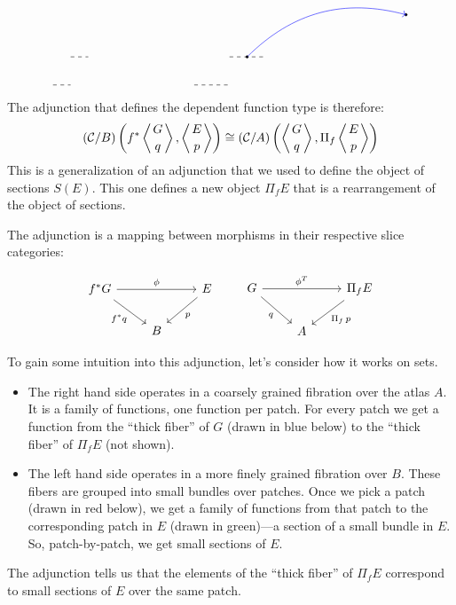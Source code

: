 \documentclass[DaoFP]{subfiles}
\begin{document}
\[\begin{tikzpicture}
\filldraw[black] (\xl + 3 * \dx, \yb + 5* \dy) circle (1 pt);
\filldraw[black] (\xr + 3 * \dx, \yb + 8* \dy) circle (1 pt);

\draw[blue] ((\xl + 3 * \dx, \yb + 5* \dy) edge[->, bend left] (\xr + 3 * \dx, \yb + 8* \dy);

\draw[dashed] (\xl, \yb + 3* \dy) -- (\xl + 2 * \dx, \yb + 3* \dy);
\draw[dashed] (\xl + 2 * \dx, \yb + 5* \dy) -- (\xl + 4* \dx, \yb + 5* \dy);

\draw[dashed] (\xmin, \yb + 3* \dy) -- (\xmin + \dx, \yb + 3* \dy);
\draw[dashed] (\xmin + \dx, \yb + 5* \dy) -- (\xmin + 2 * \dx, \yb + 5* \dy);

\end{tikzpicture}
\]

The adjunction that defines the dependent function type is therefore:
\[ (\mathcal{C}/B) \left( f^* \left \langle {G \atop q} \right \rangle, \left \langle {E \atop p} \right \rangle \right) \cong  (\mathcal{C}/A)\left( \left \langle {G \atop q} \right \rangle, \Pi_f \left \langle {E \atop p } \right \rangle \right) \]
This is a generalization of an adjunction that we used to define the object of sections $S(E)$. This one defines a new object $\Pi_f E$ that is a rearrangement of the object of sections. 

The adjunction is a mapping between morphisms in their respective slice categories:

\[
 \begin{tikzcd}
 f^* G
 \arrow[rr, "\phi"]
 \arrow[rd, "f^* q"']
 &&E
 \arrow[dl, "p"]
 \\
 &B
 \end{tikzcd}
 \hspace{20pt}
\begin{tikzcd}
 G
 \arrow[rr, "\phi^T"]
 \arrow[rd, "q"']
 && \Pi_f E
 \arrow[ld, "\Pi_f \, p"]
 \\
 & A
  \end{tikzcd}
\]

To gain some intuition into this adjunction, let's consider how it works on sets. 

\begin{itemize}
\item The right hand side operates in a coarsely grained fibration over the atlas $A$. It is a family of functions, one function per patch. For every patch we get a function from the ``thick fiber'' of $G$ (drawn in blue below) to the ``thick fiber'' of $\Pi_f E$ (not shown).

\item The left hand side operates in a more finely grained fibration over $B$. These fibers are grouped into small bundles over patches. Once we pick a patch (drawn in red below), we get a family of functions from that patch to the corresponding patch in $E$ (drawn in green)---a section of a small bundle in $E$. So, patch-by-patch, we get small sections of $E$. 
\end{itemize}
The adjunction tells us that the elements of the ``thick fiber'' of $\Pi_f E$ correspond to small sections of $E$ over the same patch.
\end{document}
